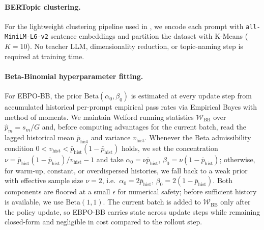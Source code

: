 \documentclass{article}
\theoremstyle{plain}
\theoremstyle{definition}
\theoremstyle{remark}
\newcommand{\oursBB}{\textsc{EBPO-BB}\xspace}
\begin{document}
\paragraph{BERTopic clustering.}
For the lightweight clustering pipeline used in , we encode each prompt with \texttt{all-MiniLM-L6-v2} sentence embeddings and partition the dataset with K-Means ($K=10$). No teacher LLM, dimensionality reduction, or topic-naming step is required at training time.


\paragraph{Beta-Binomial hyperparameter fitting.}
For \oursBB, the prior $\mathrm{Beta}(\alpha_0,\beta_0)$ is estimated at every update step from accumulated historical per-prompt empirical pass rates via Empirical Bayes with method of moments. We maintain Welford running statistics $\mathcal W_{\mathrm{BB}}$ over $\hat p_m=s_m/G$ and, before computing advantages for the current batch, read the lagged historical mean $\bar p_{\mathrm{hist}}$ and variance $v_{\mathrm{hist}}$. Whenever the Beta admissibility condition $0<v_{\mathrm{hist}}<\bar p_{\mathrm{hist}}(1-\bar p_{\mathrm{hist}})$ holds, we set the concentration
$\nu=\bar p_{\mathrm{hist}}(1-\bar p_{\mathrm{hist}})/v_{\mathrm{hist}}-1$
and take $\alpha_0=\nu\bar p_{\mathrm{hist}}$, $\beta_0=\nu(1-\bar p_{\mathrm{hist}})$; otherwise, for warm-up, constant, or overdispersed histories, we fall back to a weak prior with effective sample size $\nu=2$, i.e.\ $\alpha_0=2\bar p_{\mathrm{hist}}$, $\beta_0=2(1-\bar p_{\mathrm{hist}})$. Both components are floored at a small $\epsilon$ for numerical safety; before sufficient history is available, we use $\mathrm{Beta}(1,1)$. The current batch is added to $\mathcal W_{\mathrm{BB}}$ only after the policy update, so \oursBB carries state across update steps while remaining closed-form and negligible in cost compared to the rollout step.
\end{document}
